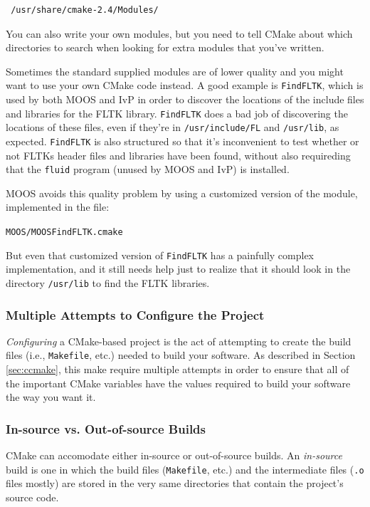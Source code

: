 \documentclass[letterpaper,10pt]{article}
\begin{document}
\begin{verbatim}
 /usr/share/cmake-2.4/Modules/
\end{verbatim} 


You can also write your
own modules, but you need to tell CMake about which directories to search when
looking for extra modules that you've written.

Sometimes the standard supplied modules are of lower quality and you might want
to use your own CMake code instead.  A good example is \verb|FindFLTK|, 
which is used by both MOOS and IvP in order to discover the locations of the
include files and libraries for the FLTK library.  \verb|FindFLTK| does a bad
job of discovering the locations of these files, even if they're in
\verb|/usr/include/FL| and \verb|/usr/lib|, as expected.  \verb|FindFLTK| is 
also structured so that it's inconvenient to test whether or not FLTKs header
files and libraries have been found, without also requireding that the 
\verb|fluid| program (unused by MOOS and IvP) is installed.

MOOS avoids this quality problem by using a customized version of the module,
implemented in the file:

\verb|MOOS/MOOSFindFLTK.cmake|

But even that customized version of \verb|FindFLTK| has a painfully complex
implementation, and it still needs help just to realize that it should look
in the directory \verb|/usr/lib|
to find the FLTK libraries.


\subsubsection{Multiple Attempts to Configure the Project}
\textit{Configuring} a CMake-based project is the act of attempting to create
the build files (i.e., \verb|Makefile|, etc.) needed to build your software.
As described in Section \ref{sec:ccmake}, this make require multiple attempts
in order to ensure that all of the important CMake variables have the values
required to build your software the way you want it.

\subsubsection{In-source vs. Out-of-source Builds}
CMake can accomodate either in-source or out-of-source builds.  An 
\textit{in-source} build is one in which the build files (\verb|Makefile|, etc.)
and the intermediate files (\verb|.o| files mostly) are stored in the very same
directories that contain the project's source code.  
\end{document}
